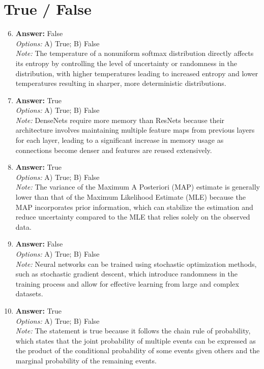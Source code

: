 \documentclass[12pt]{article}
\begin{document}
\section*{True / False}
\begin{enumerate}[label=\arabic*.]
\setcounter{enumi}{5}
\item \textbf{Answer:} False
\\ \textit{Options:} A) True; B) False
\\ \textit{Note:} The temperature of a nonuniform softmax distribution directly affects its entropy by controlling the level of uncertainty or randomness in the distribution, with higher temperatures leading to increased entropy and lower temperatures resulting in sharper, more deterministic distributions.
\item \textbf{Answer:} True
\\ \textit{Options:} A) True; B) False
\\ \textit{Note:} DenseNets require more memory than ResNets because their architecture involves maintaining multiple feature maps from previous layers for each layer, leading to a significant increase in memory usage as connections become denser and features are reused extensively.
\item \textbf{Answer:} True
\\ \textit{Options:} A) True; B) False
\\ \textit{Note:} The variance of the Maximum A Posteriori (MAP) estimate is generally lower than that of the Maximum Likelihood Estimate (MLE) because the MAP incorporates prior information, which can stabilize the estimation and reduce uncertainty compared to the MLE that relies solely on the observed data.
\item \textbf{Answer:} False
\\ \textit{Options:} A) True; B) False
\\ \textit{Note:} Neural networks can be trained using stochastic optimization methods, such as stochastic gradient descent, which introduce randomness in the training process and allow for effective learning from large and complex datasets.
\item \textbf{Answer:} True
\\ \textit{Options:} A) True; B) False
\\ \textit{Note:} The statement is true because it follows the chain rule of probability, which states that the joint probability of multiple events can be expressed as the product of the conditional probability of some events given others and the marginal probability of the remaining events.
\end{enumerate}
\end{document}
